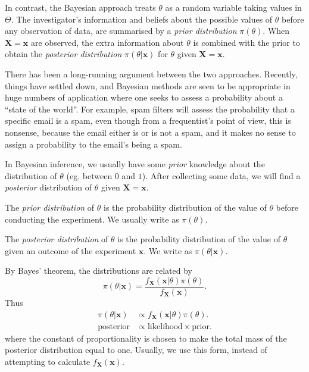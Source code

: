 \documentclass[a4paper]{article}
\begin{document}
In contrast, the Bayesian approach treats $\theta$ as a random variable taking values in $\Theta$. The investigator's information and beliefs about the possible values of $\theta$ before any observation of data, are summarised by a \emph{prior distribution} $\pi(\theta)$. When $\mathbf{X} = \mathbf{x}$ are observed, the extra information about $\theta$ is combined with the prior to obtain the \emph{posterior distribution} $\pi(\theta|\mathbf{x})$ for $\theta$ given $\mathbf{X} = \mathbf{x}$.

There has been a long-running argument between the two approaches. Recently, things have settled down, and Bayesian methods are seen to be appropriate in huge numbers of application where one seeks to assess a probability about a ``state of the world''. For example, spam filters will assess the probability that a specific email is a spam, even though from a frequentist's point of view, this is nonsense, because the email either is or is not a spam, and it makes no sense to assign a probability to the email's being a spam.

In Bayesian inference, we usually have some \emph{prior} knowledge about the distribution of $\theta$ (eg. between $0$ and $1$). After collecting some data, we will find a \emph{posterior} distribution of $\theta$ given $\mathbf{X} = \mathbf{x}$.

\begin{defi}
  The \emph{prior distribution} of $\theta$ is the probability distribution of the value of $\theta$ before conducting the experiment. We usually write as $\pi(\theta)$.

  The \emph{posterior distribution} of $\theta$ is the probability distribution of the value of $\theta$ given an outcome of the experiment $\mathbf{x}$. We write as $\pi(\theta|\mathbf{x})$.
\end{defi}
By Bayes' theorem, the distributions are related by
\[
  \pi(\theta|\mathbf{x}) = \frac{f_{\mathbf{X}}(\mathbf{x}|\theta)\pi(\theta)}{f_{\mathbf{X}}(\mathbf{x})}.
\]
Thus
\begin{align*}
  \pi(\theta|\mathbf{x}) &\propto f_{\mathbf{X}}(\mathbf{x}|\theta)\pi(\theta).\\
  \text{posterior} &\propto \text{likelihood}\times\text{prior}.
\end{align*}
where the constant of proportionality is chosen to make the total mass of the posterior distribution equal to one. Usually, we use this form, instead of attempting to calculate $f_\mathbf{X}(\mathbf{x})$.
\end{document}
